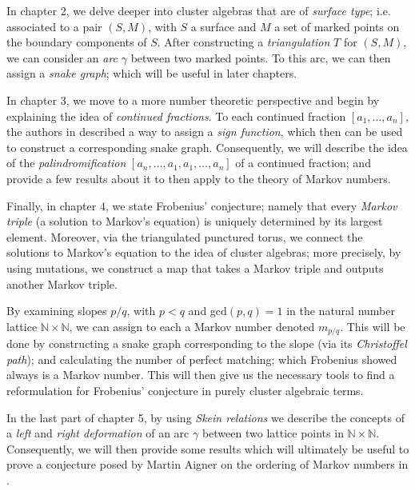 \documentclass[12pt,vu]{adammath}
\theoremstyle{theorem}
\theoremstyle{corollary}
\theoremstyle{conjecture}
\theoremstyle{proposition}
\theoremstyle{definition}
\theoremstyle{remark}
\begin{document}
In chapter 2, we delve deeper into cluster algebras that are of \emph{surface type}; i.e. associated to a pair $(S,M)$, with $S$ a surface and $M$ a set of marked points on the boundary components of $S$. After constructing a \emph{triangulation} $T$ for $(S,M)$, we can consider an \emph{arc} $\gamma$ between two marked points. To this arc, we can then assign a \emph{snake graph}; which will be useful in later chapters.

In chapter 3, we move to a more number theoretic perspective and begin by explaining the idea of \emph{continued fractions}. To each continued fraction $[a_1,\dots,a_n]$, the authors in \cite{CS1} described a way to assign a \emph{sign function}, which then can be used to construct a corresponding snake graph. Consequently, we will describe the idea of the \emph{palindromification} $[a_n,\dots,a_1,a_1,\dots,a_n]$ of a continued fraction; and provide a few results about it to then apply to the theory of Markov numbers. 

Finally, in chapter 4, we state Frobenius' conjecture; namely that every \emph{Markov triple} (a solution to Markov's equation) is uniquely determined by its largest element. Moreover, via the triangulated punctured torus, we connect the solutions to Markov's equation to the idea of cluster algebras; more precisely, by using mutations, we construct a map that takes a Markov triple and outputs another Markov triple. 

By examining slopes $p/q$, with $p<q$ and gcd$(p,q) = 1$ in the natural number lattice $\mathbb{N}\times \mathbb{N}$, we can assign to each a Markov number denoted $m_{p/q}$. This will be done by constructing a snake graph corresponding to the slope (via its \emph{Christoffel path}); and calculating the number of perfect matching; which Frobenius showed always is a Markov number. This will then give us the necessary tools to find a reformulation for Frobenius' conjecture in purely cluster algebraic terms.

In the last part of chapter 5, by using \emph{Skein relations} we describe the concepts of a \emph{left} and \emph{right deformation} of an arc $\gamma$ between two lattice points in $\mathbb{N}\times \mathbb{N}$. Consequently, we will then provide some results which will ultimately be useful to prove a conjecture posed by Martin Aigner on the ordering of Markov numbers in \cite{A}.







\end{document}
